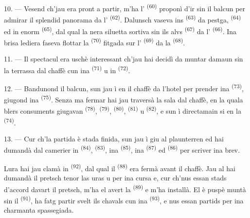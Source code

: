 10. --- Vesend ch'jau era pront a partir, m'ha l'
\textsuperscript{(60)} proponì d'ir sin il balcun per admirar il splendid panorama da
l' \textsuperscript{(62)}. Dalunsch vaseva ins 
\textsuperscript{(63)} da pestga,  \textsuperscript{(64)} ed in enorm
 \textsuperscript{(65)}, dal qual la nera siluetta sortiva sin ils alvs
 \textsuperscript{(67)} da l' \textsuperscript{(66)}. Ina brisa
lediera faseva flottar la  \textsuperscript{(70)} fitgada sur
l'
\textsuperscript{(69)} da la  \textsuperscript{(68)}.

\VUsaut{3.0mm}
\VUsaut{3.0mm}

11. --- Il spectacul era uschè interessant ch'jau hai decidì da muntar damaun sin la
terrassa dal chaffè cun ina  \textsuperscript{(71)} u in 
\textsuperscript{(72)}.

12. --- Bandunond il balcun, sun jau ì en il chaffè da l'hotel per prender ina
 \textsuperscript{(73)}, giugond ina 
\textsuperscript{(75)}. Senza ma fermar hai jau traversà la sala dal chaffè, en la quala
blers consuments giugavan  \textsuperscript{(78)}, 
\textsuperscript{(79)},  \textsuperscript{(80)}, 
\textsuperscript{(81)} u  \textsuperscript{(82)}, e sun ì directamain si en la
 \textsuperscript{(74)}.

13. --- Cur ch'la partida è stada finida, sun jau ì giu al plaunterren ed hai dumandà
dal camerier in  \textsuperscript{(84)},
 \textsuperscript{(83)},
ina  \textsuperscript{(85)}, ina  \textsuperscript{(87)}
ed
 \textsuperscript{(86)} per scriver ina brev.

Lura hai jau clamà in  \textsuperscript{(92)}, dal qual il
 \textsuperscript{(88)} era fermà avant il chaffè. Jau al hai dumandà il
pretsch tenor las uras u per ina cursa e, cur ch'nus essan stads d'accord davart il
pretsch, m'ha el avert la  \textsuperscript{(89)} e m'ha
installà. El è puspè muntà sin il  \textsuperscript{(91)}, ha fatg partir
svelt ils chavals cun ina  \textsuperscript{(93)}, e nus essan partids per
ina charmanta spassegiada.

\VUsaut{6.0mm}
\VUfilet{22mm}
